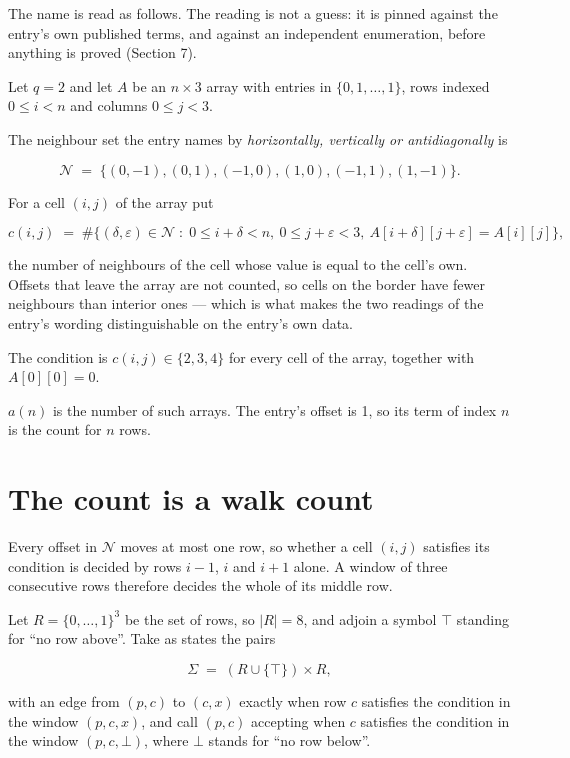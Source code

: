 \documentclass[11pt]{article}
\theoremstyle{definition}
\begin{document}
The name is read as follows. The reading is not a guess: it is pinned against the entry's own published terms, and against an independent enumeration, before anything is proved (Section 7).

Let $q = 2$ and let $A$ be an $n \times 3$ array with entries in $\{0,1,\dots,1\}$, rows indexed $0 \le i < n$ and columns $0 \le j < 3$.

The neighbour set the entry names by {\itshape horizontally, vertically or antidiagonally} is

\[\mathcal{N} \;=\; \{(0,-1), (0,1), (-1,0), (1,0), (-1,1), (1,-1)\}.\]

For a cell $(i,j)$ of the array put

\[c(i,j) \;=\; \#\bigl\{(\delta,\varepsilon)\in\mathcal{N} \;:\; 0\le i+\delta<n,\ 0\le j+\varepsilon<3,\ A[i+\delta][j+\varepsilon] = A[i][j]\bigr\},\]

the number of neighbours of the cell whose value is equal to the cell's own. Offsets that leave the array are not counted, so cells on the border have fewer neighbours than interior ones --- which is what makes the two readings of the entry's wording distinguishable on the entry's own data.

The condition is $c(i,j) \in \{2, 3, 4\}$ for every cell of the array, together with $A[0][0]=0$.

$a(n)$ is the number of such arrays. The entry's offset is 1, so its term of index $n$ is the count for $n$ rows.

\section{The count is a walk count}

Every offset in $\mathcal{N}$ moves at most one row, so whether a cell $(i,j)$ satisfies its condition is decided by rows $i-1$, $i$ and $i+1$ alone. A window of three consecutive rows therefore decides the whole of its middle row.

Let $R = \{0,\dots,1\}^{3}$ be the set of rows, so $|R| = 8$, and adjoin a symbol $\top$ standing for ``no row above''. Take as states the pairs

\[\Sigma \;=\; (R \cup \{\top\}) \times R,\]

with an edge from $(p,c)$ to $(c,x)$ exactly when row $c$ satisfies the condition in the window $(p,c,x)$, and call $(p,c)$ accepting when $c$ satisfies the condition in the window $(p,c,\bot)$, where $\bot$ stands for ``no row below''.
\end{document}
